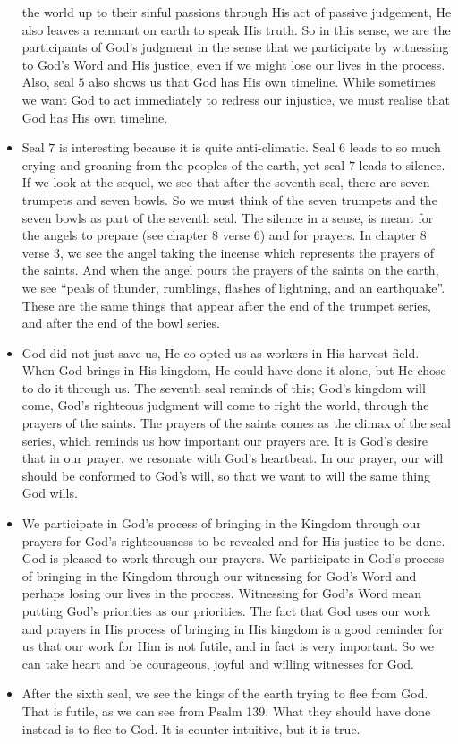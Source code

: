 \begin{itemize}
{  the world up to their sinful passions through His act of passive judgement,
  He also leaves a remnant on earth to speak His truth.  So in this sense, we
  are the participants of God's judgment in the sense that we participate by
  witnessing to God's Word and His justice, even if we might lose our lives
  in the process.  Also, seal $5$ also shows us that God has His own
  timeline.  While sometimes we want God to act immediately to redress our
  injustice, we must realise that God has His own timeline.}
  \item{Seal $7$ is interesting because it is quite anti-climatic.  Seal $6$
  leads to so much crying and groaning from the peoples of the earth, yet
  seal $7$ leads to silence.  If we look at the sequel, we see that after the
  seventh seal, there are seven trumpets and seven bowls.  So we must think
  of the seven trumpets and the seven bowls as part of the seventh seal.  The
  silence in a sense, is meant for the angels to prepare (see chapter 8 verse
  6) and for prayers.  In chapter 8 verse 3, we see the angel taking the
  incense which represents the prayers of the saints.  And when the angel
  pours the prayers of the saints on the earth, we see ``peals of thunder,
  rumblings, flashes of lightning, and an earthquake''.  These are the same
  things that appear after the end of the trumpet series, and after the end
  of the bowl series. }
  \item{God did not just save us, He co-opted us as workers in His harvest
  field.  When God brings in His kingdom, He could have done it alone, but He
  chose to do it through us.  The seventh seal reminds of this; God's kingdom
  will come, God's righteous judgment will come to right the world, through
  the prayers of the saints.  The prayers of the saints comes as the climax
  of the seal series, which reminds us how important our prayers are.  It is
  God's desire that in our prayer, we resonate with God's heartbeat.  In our
  prayer, our will should be conformed to God's will, so that we want to will
  the same thing God wills.  }
  \item{We participate in God's process of bringing in the Kingdom through
  our prayers for God's righteousness to be revealed and for His justice to
  be done.  God is pleased to work through our prayers.  We participate in
  God's process of bringing in the Kingdom through our witnessing for God's
  Word and perhaps losing our lives in the process.  Witnessing for God's
  Word mean putting God's priorities as our priorities.  The fact that God
  uses our work and prayers in His process of bringing in His kingdom is a
  good reminder for us that our work for Him is not futile, and in fact is
  very important.  So we can take heart and be courageous, joyful and willing
  witnesses for God.}
  \item{After the sixth seal, we see the kings of the earth trying to flee
  from God.  That is futile, as we can see from Psalm 139.  What they should
  have done instead is to flee to God.  It is counter-intuitive, but it is
  true.}
\end{itemize}